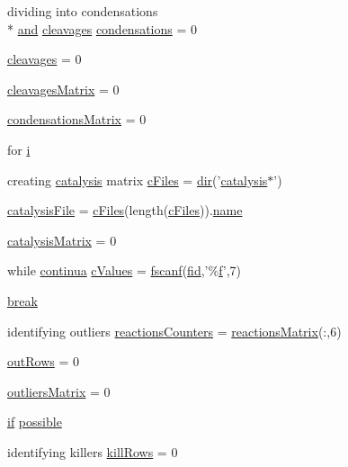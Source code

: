 \begin{DoxyCompactItemize}
dividing into condensations \\*
\hyperlink{a00022_a170f8acb213f91bf71c77b1d20bceb33}{and} \hyperlink{a00024_a89060c6979e5a4ff7b0985b35f295695}{cleavages} \hyperlink{a00023_ad3aa27d88a7e9d77d8334155860269bb}{condensations} = 0
\item 
\hyperlink{a00023_a89060c6979e5a4ff7b0985b35f295695}{cleavages} = 0
\item 
\hyperlink{a00023_a1a691fb4f955887edfa538e91479fafe}{cleavages\-Matrix} = 0
\item 
\hyperlink{a00023_afaba8eef2f8f4e4dda2e893a19e55a94}{condensations\-Matrix} = 0
\item 
for \hyperlink{a00023_ac870e1cd47f6d78f16a98a24c8392fcf}{i}
\item 
creating \hyperlink{a00006}{catalysis} matrix \hyperlink{a00023_a9eab57ccb42a39c704f47dc30e4f4515}{c\-Files} = \hyperlink{a00065_a4ca269cf93df1b512b52174c1a256fe5}{dir}('\hyperlink{a00006}{catalysis}$\ast$')
\item 
\hyperlink{a00023_a33e70cf5b45cb59005b82d30202f0b69}{catalysis\-File} = \hyperlink{a00024_a9eab57ccb42a39c704f47dc30e4f4515}{c\-Files}(length(\hyperlink{a00024_a9eab57ccb42a39c704f47dc30e4f4515}{c\-Files})).\hyperlink{a00021_abbf559a76fab59203496b0847ab9502a}{name}
\item 
\hyperlink{a00023_a0810027f58d6be965e44b7b84c44ace8}{catalysis\-Matrix} = 0
\item 
while \hyperlink{a00024_a9c951ebd5bc3f1adce943bee1255f4d6}{continua} \hyperlink{a00023_ad4ba7701967c1da20171228afccb7081}{c\-Values} = \hyperlink{a00019_a028ac102a731e62fb0a7439381f566c1}{fscanf}(\hyperlink{a00025_ae9011d40c6f13e68e6f07156e0da7c5d}{fid},'\%\hyperlink{a00019_a9c5a71c46b1abb8b7df5ebeac6c81535}{f}',7)
\item 
\hyperlink{a00023_a91cf6fbebedd86150a36e5ac3d5d3bfc}{break}
\item 
identifying outliers \hyperlink{a00023_aeea253cb98a56047ef20ceed86e2f0ea}{reactions\-Counters} = \hyperlink{a00024_af998036b749d9fa6dd2365f9937279b6}{reactions\-Matrix}(\-:,6)
\item 
\hyperlink{a00023_a60cfb1ca20cbbc81b85a8f56658b7c99}{out\-Rows} = 0
\item 
\hyperlink{a00023_ad8a18b407726bf44299c9bcf5d1389ff}{outliers\-Matrix} = 0
\item 
\hyperlink{a00024_a01d55766b8058903dd360b4bda71f9f5}{if} \hyperlink{a00023_a07c9e68cdbafe572c04d3112d64deb88}{possible}
\item 
identifying killers \hyperlink{a00023_a747bc1d10158c78e88e314825ed41a13}{kill\-Rows} = 0

\end{DoxyCompactItemize}
